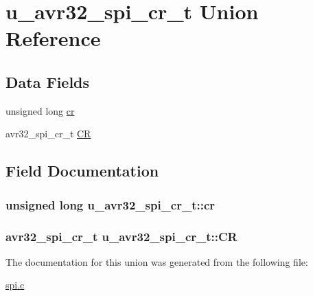 \hypertarget{unionu__avr32__spi__cr__t}{
\section{u\-\_\-avr32\-\_\-spi\-\_\-cr\-\_\-t \-Union \-Reference}
\label{unionu__avr32__spi__cr__t}
}
\subsection*{\-Data \-Fields}
\begin{DoxyCompactItemize}
\item 
unsigned long \hyperlink{unionu__avr32__spi__cr__t_a9a625d64d160e69baf044b8938e01468}{cr}
\item 
avr32\-\_\-spi\-\_\-cr\-\_\-t \hyperlink{unionu__avr32__spi__cr__t_afb4bf79a0ac649f1c5593215a4f0c452}{\-C\-R}
\end{DoxyCompactItemize}


\subsection{\-Field \-Documentation}
\hypertarget{unionu__avr32__spi__cr__t_a9a625d64d160e69baf044b8938e01468}{
\subsubsection[{cr}]{\setlength{\rightskip}{0pt plus 5cm}unsigned long {\bf u\-\_\-avr32\-\_\-spi\-\_\-cr\-\_\-t\-::cr}}}
\label{unionu__avr32__spi__cr__t_a9a625d64d160e69baf044b8938e01468}
\hypertarget{unionu__avr32__spi__cr__t_afb4bf79a0ac649f1c5593215a4f0c452}{
\subsubsection[{\-C\-R}]{\setlength{\rightskip}{0pt plus 5cm}avr32\-\_\-spi\-\_\-cr\-\_\-t {\bf u\-\_\-avr32\-\_\-spi\-\_\-cr\-\_\-t\-::\-C\-R}}}
\label{unionu__avr32__spi__cr__t_afb4bf79a0ac649f1c5593215a4f0c452}


\-The documentation for this union was generated from the following file\-:\begin{DoxyCompactItemize}
\item 
\hyperlink{spi_8c}{spi.\-c}\end{DoxyCompactItemize}
